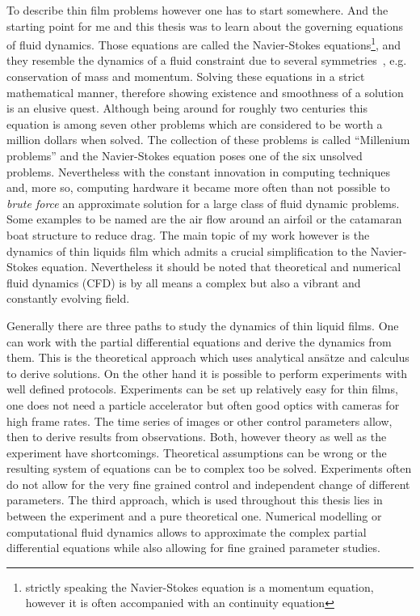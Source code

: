 To describe thin film problems however one has to start somewhere.
And the starting point for me and this thesis was to learn about the governing equations of fluid dynamics. 
Those equations are called the Navier-Stokes equations\footnote{strictly speaking the Navier-Stokes equation is a momentum equation, however it is often accompanied with an continuity equation}, and they resemble the dynamics of a fluid constraint due to several symmetries~\cite{Navier, Stokes}, e.g. conservation of mass and momentum.
Solving these equations in a strict mathematical manner, therefore showing existence and smoothness of a solution is an elusive quest. 
Although being around for roughly two centuries this equation is among seven other problems which are considered to be worth a million dollars when solved. 
The collection of these problems is called ``Millenium problems'' and the Navier-Stokes equation poses one of the six unsolved problems.
Nevertheless with the constant innovation in computing techniques and, more so, computing hardware it became more often than not possible to \textit{brute force} an approximate solution for a large class of fluid dynamic problems.
Some examples to be named are the air flow around an airfoil or the catamaran boat structure to reduce drag. 
The main topic of my work however is the dynamics of thin liquids film which admits a crucial simplification to the Navier-Stokes equation. 
Nevertheless it should be noted that theoretical and numerical fluid dynamics (CFD) is by all means a complex but also a vibrant and constantly evolving field.

Generally there are three paths to study the dynamics of thin liquid films.
One can work with the partial differential equations and derive the dynamics from them. 
This is the theoretical approach which uses analytical ansätze and calculus to derive solutions.
On the other hand it is possible to perform experiments with well defined protocols.
Experiments can be set up relatively easy for thin films, one does not need a particle accelerator but often good optics with cameras for high frame rates. 
The time series of images or other control parameters allow, then to derive results from observations.
Both, however theory as well as the experiment have shortcomings. 
Theoretical assumptions can be wrong or the resulting system of equations can be to complex too be solved. 
Experiments often do not allow for the very fine grained control and independent change of different parameters.
The third approach, which is used throughout this thesis lies in between the experiment and a pure theoretical one.
Numerical modelling or computational fluid dynamics allows to approximate the complex partial differential equations while also allowing for fine grained parameter studies.

